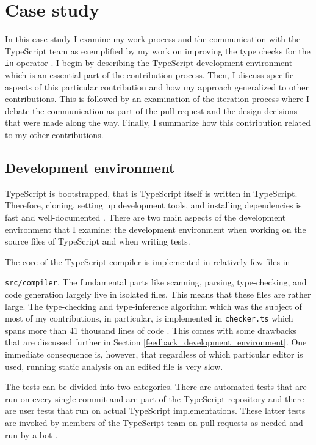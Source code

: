 \documentclass[12pt]{scrartcl}
\def\code#1{\texttt{\frenchspacing#1}}
\let\oldsection\section
\renewcommand\section{\clearpage\oldsection}
\begin{document}
\section{Case study}
\label{case_study}

In this case study I examine my work process and the communication with the TypeScript team as exemplified by my work on improving the type checks for the \code{in} operator \cite{41317}. I begin by describing the TypeScript development environment which is an essential part of the contribution process. Then, I discuss specific aspects of this particular contribution and how my approach generalized to other contributions. This is followed by an examination of the iteration process where I debate the communication as part of the pull request and the design decisions that were made along the way. Finally, I summarize how this contribution related to my other contributions.

\subsection{Development environment}

TypeScript is bootstrapped, that is TypeScript itself is written in TypeScript. Therefore, cloning, setting up development tools, and installing dependencies is fast and well-documented \cite{ContributingGuidelines}. There are two main aspects of the development environment that I examine: the development environment when working on the source files of TypeScript and when writing tests.

The core of the TypeScript compiler is implemented in relatively few files in \par\code{src/compiler}. The fundamental parts like scanning, parsing, type-checking, and code generation largely live in isolated files. This means that these files are rather large. The type-checking and type-inference algorithm which was the subject of most of my contributions, in particular, is implemented in \code{checker.ts} which spans more than 41 thousand lines of code \cite{CheckerFile}. This comes with some drawbacks that are discussed further in Section \ref{feedback_development_environment}. One immediate consequence is, however, that regardless of which particular editor is used, running static analysis on an edited file is very slow.

The tests can be divided into two categories. There are automated tests that are run on every single commit and are part of the TypeScript repository \cite{ContributingGuidelines} and there are user tests that run on actual TypeScript implementations. These latter tests are invoked by members of the TypeScript team on pull requests as needed and run by a bot \cite{UserTests}.
\end{document}
